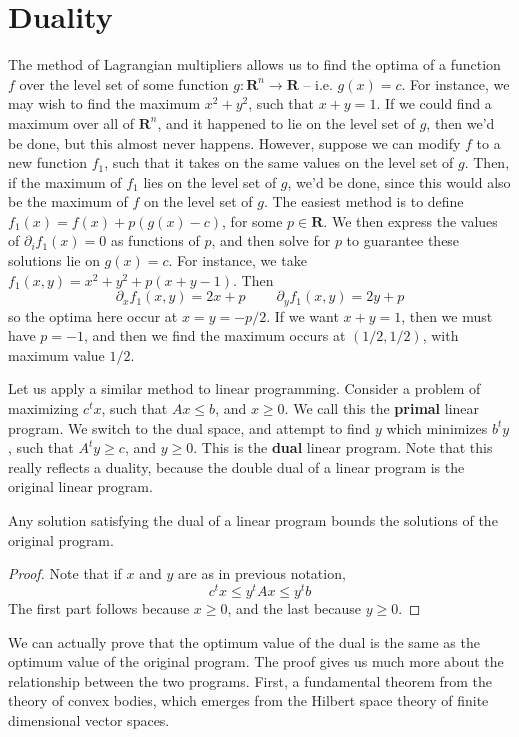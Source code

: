 \chapter{Duality}

The method of Lagrangian multipliers allows us to find the optima of a function $f$ over the level set of some function $g: \mathbf{R}^n \to \mathbf{R}$ -- i.e. $g(x) = c$. For instance, we may wish to find the maximum $x^2 + y^2$, such that $x + y = 1$. If we could find a maximum over all of $\mathbf{R}^n$, and it happened to lie on the level set of $g$, then we'd be done, but this almost never happens. However, suppose we can modify $f$ to a new function $f_1$, such that it takes on the same values on the level set of $g$. Then, if the maximum of $f_1$ lies on the level set of $g$, we'd be done, since this would also be the maximum of $f$ on the level set of $g$. The easiest method is to define $f_1(x) = f(x) + p(g(x) - c)$, for some $p \in \mathbf{R}$. We then express the values of $\partial_i f_1(x) = 0$ as functions of $p$, and then solve for $p$ to guarantee these solutions lie on $g(x) = c$. For instance, we take $f_1(x,y) = x^2 + y^2 + p(x + y - 1)$. Then
%
\[ \partial_x f_1(x,y) = 2x + p\ \ \ \ \ \ \ \ \ \ \partial_y f_1(x,y) = 2y + p \]
%
so the optima here occur at $x = y = -p/2$. If we want $x + y = 1$, then we must have $p = -1$, and then we find the maximum occurs at $(1/2,1/2)$, with maximum value $1/2$.

Let us apply a similar method to linear programming. Consider a problem of maximizing $c^t x$, such that $Ax \leq b$, and $x \geq 0$. We call this the {\bf primal} linear program. We switch to the dual space, and attempt to find $y$ which minimizes $b^t y$, such that $A^t y \geq c$, and $y \geq 0$. This is the {\bf dual} linear program. Note that this really reflects a duality, because the double dual of a linear program is the original linear program.

\begin{theorem}
    Any solution satisfying the dual of a linear program bounds the solutions of the original program.
\end{theorem}
\begin{proof}
    Note that if $x$ and $y$ are as in previous notation,
    \[ c^t x \leq y^t A x \leq y^t b \]
    The first part follows because $x \geq 0$, and the last because $y \geq 0$.
\end{proof}

We can actually prove that the optimum value of the dual is the same as the optimum value of the original program. The proof gives us much more about the relationship between the two programs. First, a fundamental theorem from the theory of convex bodies, which emerges from the Hilbert space theory of finite dimensional vector spaces.

